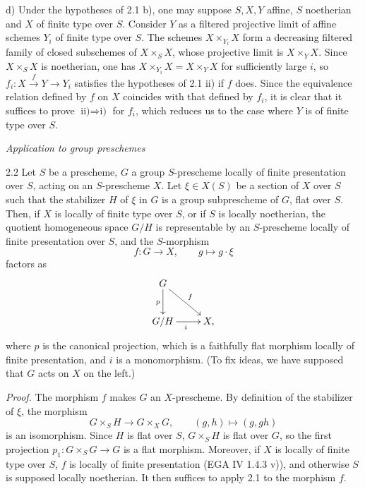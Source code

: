 \noindent d) Under the hypotheses of 2.1 b), one may suppose $S,X,Y$ affine, $S$ noetherian and $X$ of finite type over $S$. Consider $Y$ as a filtered projective limit of affine schemes $Y_i$ of finite type over $S$. The schemes $X\times_{Y_i}X$ form a decreasing filtered family of closed subschemes of $X\times_S X$, whose projective limit is $X\times_Y X$. Since $X\times_S X$ is noetherian, one has $X\times_{Y_i}X=X\times_Y X$ for sufficiently large $i$, so $f_i:X\xrightarrow{f}Y\to Y_i$ satisfies the hypotheses of 2.1 ii) if $f$ does. Since the equivalence relation defined by $f$ on $X$ coincides with that defined by $f_i$, it is clear that it suffices to prove $\text{ii)}\Rightarrow\text{i)}$ for $f_i$, which reduces us to the case where $Y$ is of finite type over $S$.

\par\noindent\emph{Application to group preschemes}
\begin{theorem}{2.2}\label{XVI.2.2}
Let $S$ be a prescheme, $G$ a group $S$-prescheme locally of finite presentation over $S$, acting on an $S$-prescheme $X$. Let $\xi\in X(S)$ be a section of $X$ over $S$ such that the stabilizer $H$ of $\xi$ in $G$ is a group subprescheme of $G$, flat over $S$. Then, if $X$ is locally of finite type over $S$, or if $S$ is locally noetherian, the quotient homogeneous space $G/H$ is representable by an $S$-prescheme locally of finite presentation over $S$, and the $S$-morphism
\[
f:G\longrightarrow X,\qquad g\longmapsto g\cdot\xi
\]
factors as
\[
\xymatrix{G\ar[d]_p\ar[dr]^f&\\G/H\ar[r]_i&X,}
\]
where $p$ is the canonical projection, which is a faithfully flat morphism locally of finite presentation, and $i$ is a monomorphism. (To fix ideas, we have supposed that $G$ acts on $X$ on the left.)
\end{theorem}
\par\noindent\emph{Proof.}
The morphism $f$ makes $G$ an $X$-prescheme. By definition of the stabilizer of $\xi$, the morphism
\[
G\times_S H\longrightarrow G\times_X G,\qquad(g,h)\longmapsto(g,gh)
\]
is an isomorphism. Since $H$ is flat over $S$, $G\times_S H$ is flat over $G$, so the first projection $p_1:G\times_S G\to G$ is a flat morphism. Moreover, if $X$ is locally of finite type over $S$, $f$ is locally of finite presentation (EGA IV 1.4.3 v)), and otherwise $S$ is supposed locally noetherian. It then suffices to apply 2.1 to the morphism $f$.

